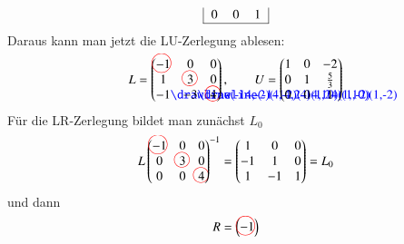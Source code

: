 \begin{beispiel}
\begin{align*}
\begin{tabular}{|>{$}c<{$}>{$}c<{$}>{$}c<{$}|}
0&0&1\\
\hline
\end{tabular}
\end{align*}
Daraus kann man jetzt die LU-Zerlegung ablesen:
\[
L=\begin{pmatrix}
-1%
\begin{picture}(0,0)
\color{red}\put(-7,4){\circle{15}}
\end{picture}%
& 0& 0\\
 1& 3%
\begin{picture}(0,0)
\color{red}\put(-3,4){\circle{12}}
\end{picture}%
& 0\\
-1%
\begin{picture}(0,0)
\color{blue}\drawline(-14,-2)(-14,24)(1,24)(1,-2)
\end{picture}%
&-3%
\begin{picture}(0,0)
\color{blue}\drawline(-14,-2)(-14,10)(1,10)(1,-2)
\end{picture}%
& 4%
\begin{picture}(0,0)
\color{red}\put(-3,4){\circle{12}}
\end{picture}%
\end{pmatrix}
,\qquad
U=\begin{pmatrix}
1& 0&-2\\
0& 1&\frac53\\
0& 0&1
\end{pmatrix}
\]
Für die LR-Zerlegung bildet man zunächst $L_0$
\[
L
\begin{pmatrix}
-1%
\begin{picture}(0,0)
\color{red}\put(-7,4){\circle{15}}
\end{picture}%
& 0& 0\\
 0& 3%
\begin{picture}(0,0)
\color{red}\put(-3,4){\circle{12}}
\end{picture}%
& 0\\
 0& 0& 4%
\begin{picture}(0,0)
\color{red}\put(-3,4){\circle{12}}
\end{picture}%
\end{pmatrix}^{-1}
=
\begin{pmatrix}
 1& 0&0\\
-1& 1&0\\
 1&-1&1
\end{pmatrix}
=L_0
\]
und dann
\[
R=
\begin{pmatrix}
-1%
\begin{picture}(0,0)
\color{red}\put(-7,4){\circle{15}}

\end{picture}
\end{pmatrix}\]
\end{beispiel}
